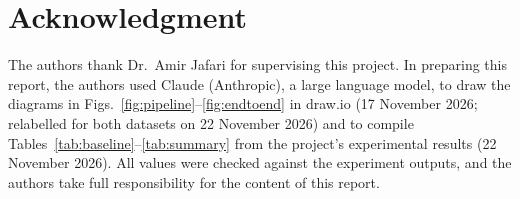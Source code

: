 \documentclass{scrartcl}
\begin{document}
\section*{Acknowledgment}

The authors thank Dr.\ Amir Jafari for supervising this project. In preparing this report, the authors used Claude (Anthropic), a large language model, to draw the diagrams in Figs.~\ref{fig:pipeline}--\ref{fig:endtoend} in draw.io (17 November 2026; relabelled for both datasets on 22 November 2026) and to compile Tables~\ref{tab:baseline}--\ref{tab:summary} from the project's experimental results (22 November 2026). All values were checked against the experiment outputs, and the authors take full responsibility for the content of this report.



\end{document}
